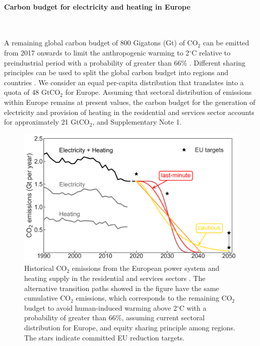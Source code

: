 \documentclass[5p]{elsarticle} %
\begin{document}
\paragraph{\textbf{Carbon budget for electricity and heating in Europe}} \

A remaining global carbon budget of 800 Gigatons (Gt) of CO$_2$ can be emitted from 2017 onwards to limit the anthropogenic warming to 2$^{\circ}$C relative to preindustrial period with a probability of greater than 66\% \cite{Figueres_2017, blog_budget}. Different sharing principles can be used to split the global carbon budget into regions and countries \cite{Raupach_2014}. We consider an equal per-capita distribution that translates into a quota of 48 GtCO$_2$ for Europe. Assuming that sectoral distribution of emissions within Europe remains at present values, the carbon budget for the generation of electricity and provision of heating in the residential and services sector accounts for approximately 21 GtCO$_2$, \cite{UNFCCC_inventory} and Supplementary Note 1.

\begin{figure}[!h]
\centering
	\includegraphics[width=\columnwidth]{figures/carbon_budget.png}
\caption{Historical CO$_2$ emissions from the European power system and heating supply in the residential and services sectors \cite{UNFCCC_inventory}. The alternative transition paths showed in the figure have the same cumulative CO$_2$ emissions, which corresponds to the remaining CO$_2$ budget to avoid human-induced warming above 2$^{\circ}$C with a probability of greater than 66\%, assuming current sectoral distribution for Europe, and equity sharing principle among regions. The stars indicate committed EU reduction targets.} \label{fig_carbon_budget} 
\end{figure}
\end{document}
